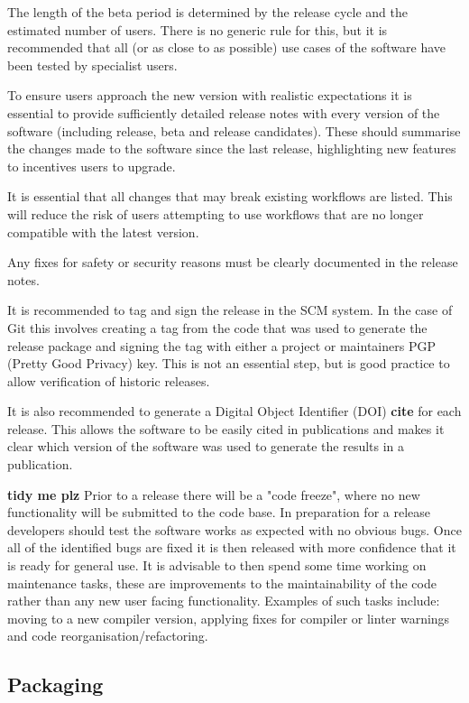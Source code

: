 \documentclass[jnr]{iosart2x}
\newcommand{\todo}[1]{\textbf{#1}}
\begin{document}
The length of the beta period is determined by the release cycle and the estimated number of users.
There is no generic rule for this, but it is recommended that all (or as close to as possible) use cases of the software have been tested by specialist users.

To ensure users approach the new version with realistic expectations it is essential to provide sufficiently detailed release notes with every version of the software (including release, beta and release candidates).
These should summarise the changes made to the software since the last release, highlighting new features to incentives users to upgrade.

It is essential that all changes that may break existing workflows are listed.
This will reduce the risk of users attempting to use workflows that are no longer compatible with the latest version.

Any fixes for safety or security reasons must be clearly documented in the release notes.

It is recommended to tag and sign the release in the SCM system.
In the case of Git this involves creating a tag from the code that was used to generate the release package and signing the tag with either a project or maintainers PGP (Pretty Good Privacy) key.
This is not an essential step, but is good practice to allow verification of historic releases.

It is also recommended to generate a Digital Object Identifier (DOI) \todo{cite} for each release.
This allows the software to be easily cited in publications and makes it clear which version of the software was used to generate the results in a publication.

\todo{tidy me plz}
Prior to a release there will be a "code freeze", where no new functionality will be submitted to the code base.
In preparation for a release developers should test the software works as expected with no obvious bugs.
Once all of the identified bugs are fixed it is then released with more confidence that it is ready for general use.
It is advisable to then spend some time working on maintenance tasks, these are improvements to the maintainability of the code rather than any new user facing functionality.
Examples of such tasks include: moving to a new compiler version, applying fixes for compiler or linter warnings and code reorganisation/refactoring.

\subsection{Packaging}
\label{Packaging}
\end{document}
